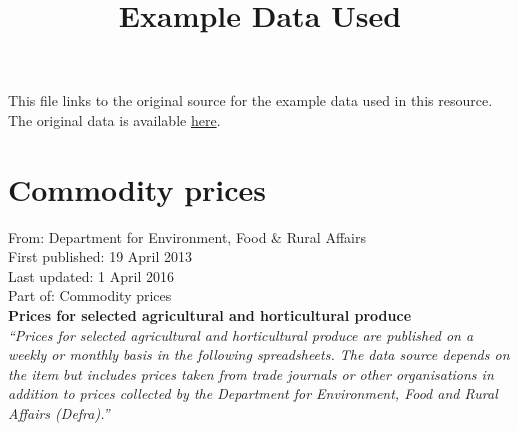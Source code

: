 \documentclass[a4paper]{article}
\title{Example Data Used}
\begin{document}
    \maketitle
    This file links to the original source for the example data used in this resource. The original data is available \href{https://www.gov.uk/government/statistical-data-sets/commodity-prices}{here}.\\

    \section*{Commodity prices}
    From: Department for Environment, Food \& Rural Affairs\\
    First published: 19 April 2013\\
    Last updated: 1 April 2016\\
    Part of: Commodity prices\\

    \textbf{Prices for selected agricultural and horticultural produce}\\
    \textit{``Prices for selected agricultural and horticultural produce are published on a weekly or monthly basis in the following spreadsheets. The data source depends on the item but includes prices taken from trade journals or other organisations in addition to prices collected by the Department for Environment, Food and Rural Affairs (Defra).''}\\
\end{document}
